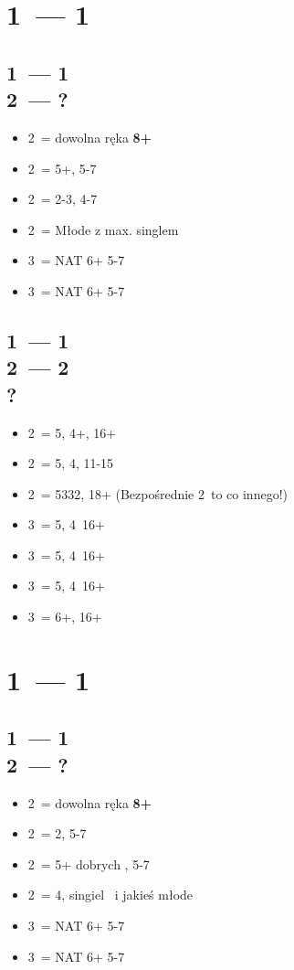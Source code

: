 \documentclass[12pt, a4paper]{article}
\begin{document}
\pagebreak
\section*{1\spades\ --- 1\ntx}
\subsection*{1\spades\ --- 1\ntx \\ 2\clubs\ --- ?}
\begin{itemize}
    \item 2\diams\ = dowolna ręka \textbf{8+}
    \item 2\hearts\ = 5+\hearts, 5-7 
    \item 2\spades\ = 2-3\spades, 4-7
    \item 2\nt\ = Młode z max. singlem \spades \imp
    \item 3\clubs\ = NAT 6+ 5-7
    \item 3\diams\ = NAT 6+ 5-7
\end{itemize}

\subsection*{1\spades\ --- 1\ntx \\ 2\clubs\ --- 2\diams \\ ?}
\begin{itemize}
    \item 2\hearts\ = 5\spades, 4+\hearts, 16+
    \item 2\spades\ = 5\spades, 4\clubs, 11-15
    \item 2\nt\ = 5332, 18+ (Bezpośrednie 2\nt\ to co innego!)
    \item 3\clubs\ = 5\spades, 4\clubs\ 16+
    \item 3\diams\ = 5\spades, 4\diams\ 16+
    \item 3\hearts\ = 5\spades, 4\hearts\ 16+
    \item 3\spades\ = 6+\spades, 16+
\end{itemize}


\pagebreak
\section*{1\hearts\ --- 1\spades}
\subsection*{1\hearts\ --- 1\spades \\ 2\clubs\ --- ?}
\begin{itemize}
    \item 2\diams\ = dowolna ręka \textbf{8+}
    \item 2\hearts\ = 2\hearts, 5-7 
    \item 2\spades\ = 5+ dobrych \spades, 5-7
    \item 2\nt\ = 4\spades, singiel \hearts\ i jakieś młode
    \item 3\clubs\ = NAT 6+ 5-7
    \item 3\diams\ = NAT 6+ 5-7
\end{itemize}
\end{document}
